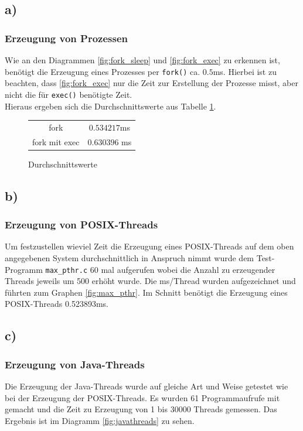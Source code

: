 \documentclass[a4paper,
12pt,
BCOR12mm,
]{scrartcl}
\begin{document}
\subsection*{a)}
\subsubsection*{Erzeugung von Prozessen}
Wie an den Diagrammen \ref{fig:fork_sleep} und \ref{fig:fork_exec} zu erkennen ist,
benötigt die Erzeugung eines Prozesses per \verb|fork()| ca. $0.5$ms.
Hierbei ist zu beachten, dass \ref{fig:fork_exec} nur die Zeit zur Erstellung der Prozesse
misst, aber nicht die für \verb|exec()| benötigte Zeit. \\
Hieraus ergeben sich die Durchschnittswerte aus Tabelle \ref{fig:fork_mean}.
 \begin{figure}[h!]
	\begin{center}
		\begin{tabular}[h!]{c|c}
			\hline
			fork & $0.534217$ms	 \\
			fork mit exec & $0.630396$ ms\\
			\hline
		\end{tabular}
	\end{center}
	\caption{Durchschnittswerte}
	\label{fig:fork_mean}
\end{figure}


\subsection*{b)}
\subsubsection*{Erzeugung von POSIX-Threads}
Um festzustellen wieviel Zeit die Erzeugung eines POSIX-Threads auf dem oben angegebenen System durchschnittlich
in Anspruch nimmt wurde dem Test-Programm \verb|max_pthr.c| 60 mal aufgerufen wobei die Anzahl zu erzeugender Threads
jeweils um 500 erhöht wurde. Die ms/Thread wurden aufgezeichnet und führten zum Graphen \ref{fig:max_pthr}.
Im Schnitt benötigt die Erzeugung eines POSIX-Threads 0.523893ms.






\subsection*{c)}
\subsubsection*{Erzeugung von Java-Threads}
Die Erzeugung der Java-Threads wurde auf gleiche Art und Weise getestet wie bei der Erzeugung der POSIX-Threads.
Es wurden 61 Programmaufrufe mit gemacht und die Zeit zu Erzeugung von 1 bis 30000 Threads gemessen.
Das Ergebnis ist im Diagramm \ref{fig:javathreads} zu sehen.
\end{document}

